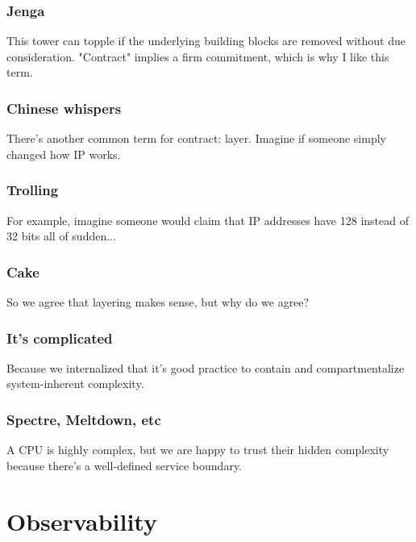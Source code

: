 \documentclass[t]{beamer}
\begin{document}
\begin{frame}
	\frametitle{Jenga}
	\begin{center}
		\vfill
		This tower can topple if the underlying building blocks are removed without due consideration.
		\vfill
		"Contract" implies a firm commitment, which is why I like this term.
		\vfill
	\end{center}
\end{frame}

\begin{frame}
	\frametitle{Chinese whispers}
	\begin{center}
		\vfill
		There's another common term for contract: layer.
		\vfill
		Imagine if someone simply changed how IP works.
		\vfill
	\end{center}
\end{frame}

\begin{frame}
	\frametitle{Trolling}
	\begin{center}
		\vfill
		For example, imagine someone would claim that IP addresses have 128 instead of 32 bits all of sudden...
		\vfill
	\end{center}
\end{frame}

\begin{frame}
	\frametitle{Cake}
	\begin{center}
		\vfill
		So we agree that layering makes sense, but why do we agree?
		\vfill
	\end{center}
\end{frame}

\begin{frame}
	\frametitle{It's complicated}
	\begin{center}
		\vfill
		Because we internalized that it's good practice to contain and compartmentalize system-inherent complexity.
		\vfill
	\end{center}
\end{frame}

\begin{frame}
	\frametitle{Spectre, Meltdown, etc}
	\begin{center}
		\vfill
		A CPU is highly complex, but we are happy to trust their hidden complexity because there's a well-defined service boundary.
		\vfill
	\end{center}
\end{frame}



\section{Observability}
\end{document}
